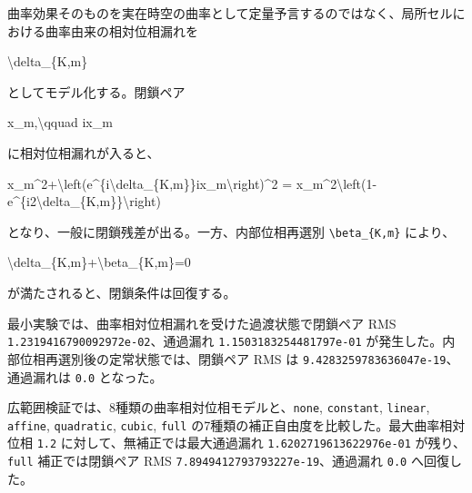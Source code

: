 \documentclass[
  a4paper,
]{article}
\newenvironment{Shaded}{}{}
\newcommand{\NormalTok}[1]{#1}
\newcounter{none} %
\begin{document}
曲率効果そのものを実在時空の曲率として定量予言するのではなく、局所セルにおける曲率由来の相対位相漏れを

\begin{Shaded}
\begin{Highlighting}[]
\NormalTok{\textbackslash{}delta\_\{K,m\}}
\end{Highlighting}
\end{Shaded}

としてモデル化する。閉鎖ペア

\begin{Shaded}
\begin{Highlighting}[]
\NormalTok{x\_m,\textbackslash{}qquad ix\_m}
\end{Highlighting}
\end{Shaded}

に相対位相漏れが入ると、

\begin{Shaded}
\begin{Highlighting}[]
\NormalTok{x\_m\^{}2+\textbackslash{}left(e\^{}\{i\textbackslash{}delta\_\{K,m\}\}ix\_m\textbackslash{}right)\^{}2}
\NormalTok{=}
\NormalTok{x\_m\^{}2\textbackslash{}left(1{-}e\^{}\{i2\textbackslash{}delta\_\{K,m\}\}\textbackslash{}right)}
\end{Highlighting}
\end{Shaded}

となり、一般に閉鎖残差が出る。一方、内部位相再選別
\texttt{\textbackslash{}beta\_\{K,m\}} により、

\begin{Shaded}
\begin{Highlighting}[]
\NormalTok{\textbackslash{}delta\_\{K,m\}+\textbackslash{}beta\_\{K,m\}=0}
\end{Highlighting}
\end{Shaded}

が満たされると、閉鎖条件は回復する。

最小実験では、曲率相対位相漏れを受けた過渡状態で閉鎖ペア RMS
\texttt{1.2319416790092972e-02}、通過漏れ
\texttt{1.1503183254481797e-01}
が発生した。内部位相再選別後の定常状態では、閉鎖ペア RMS は
\texttt{9.4283259783636047e-19}、通過漏れは \texttt{0.0} となった。

広範囲検証では、8種類の曲率相対位相モデルと、\texttt{none},
\texttt{constant}, \texttt{linear}, \texttt{affine}, \texttt{quadratic},
\texttt{cubic}, \texttt{full}
の7種類の補正自由度を比較した。最大曲率相対位相 \texttt{1.2}
に対して、無補正では最大通過漏れ \texttt{1.6202719613622976e-01}
が残り、\texttt{full} 補正では閉鎖ペア RMS
\texttt{7.8949412793793227e-19}、通過漏れ \texttt{0.0} へ回復した。
\end{document}

